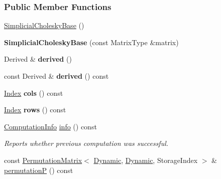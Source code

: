 \subsubsection*{Public Member Functions}
\begin{DoxyCompactItemize}
\item 
\hyperlink{group___sparse_cholesky___module_a098baba1dbe07ca3a775c8df1f8a0e71}{Simplicial\+Cholesky\+Base} ()
\item 
\mbox{\label{group___sparse_cholesky___module_a90bd237828d21cb509c815f2787153b2}} 
{\bfseries Simplicial\+Cholesky\+Base} (const Matrix\+Type \&matrix)
\item 
\mbox{\label{group___sparse_cholesky___module_a1b7c0264498027c7ef5137b5e6f9d91f}} 
Derived \& {\bfseries derived} ()
\item 
\mbox{\label{group___sparse_cholesky___module_ab711e243888c29902afba59faee258ff}} 
const Derived \& {\bfseries derived} () const
\item 
\mbox{\label{group___sparse_cholesky___module_aa494e6ff5a27911c1f8c1fb27a56ff1a}} 
\hyperlink{namespace_eigen_a62e77e0933482dafde8fe197d9a2cfde}{Index} {\bfseries cols} () const
\item 
\mbox{\label{group___sparse_cholesky___module_aafce8db4ee2d23ecf8888260d7c8b187}} 
\hyperlink{namespace_eigen_a62e77e0933482dafde8fe197d9a2cfde}{Index} {\bfseries rows} () const
\item 
\hyperlink{group__enums_ga85fad7b87587764e5cf6b513a9e0ee5e}{Computation\+Info} \hyperlink{group___sparse_cholesky___module_a3ac877f73aaaff670e6ae7554eb02fc8}{info} () const
\begin{DoxyCompactList}\small\item\em Reports whether previous computation was successful. \end{DoxyCompactList}\item 
const \hyperlink{group___core___module_class_eigen_1_1_permutation_matrix}{Permutation\+Matrix}$<$ \hyperlink{namespace_eigen_ad81fa7195215a0ce30017dfac309f0b2}{Dynamic}, \hyperlink{namespace_eigen_ad81fa7195215a0ce30017dfac309f0b2}{Dynamic}, Storage\+Index $>$ \& \hyperlink{group___sparse_cholesky___module_aff1480e595a21726beaec9a586a94d5a}{permutationP} () const

\end{DoxyCompactItemize}
